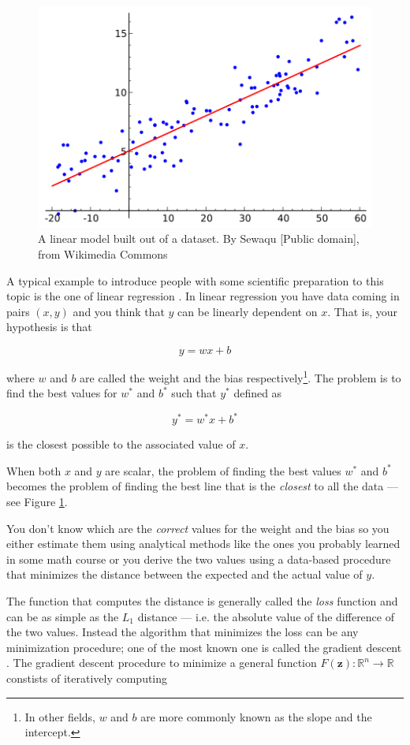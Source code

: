 \begin{figure}
  \centering
  \includegraphics[width=0.5\linewidth]{Images/wikipedia-linear-regression.png}
  \caption{A linear model built out of a dataset. By Sewaqu [Public
      domain], from Wikimedia Commons}
  \label{fig:wikipedia-linear-regression}
\end{figure}

A typical example to introduce people with some scientific preparation
to this topic is the one of linear regression \cite{B071JXYDDB}. In
linear regression you have data coming in pairs $(x, y)$ and you think
that $y$ can be linearly dependent on $x$. That is, your hypothesis is
that

\begin{equation}
  y = w x + b
  \label{eq:linear-model}
\end{equation}

where $w$ and $b$ are called the weight and the bias
respectively\footnote{In other fields, $w$ and $b$ are more commonly
  known as the slope and the intercept.}. The problem is to find the
best values for $w^*$ and $b^*$ such that $y^*$ defined as

\[ y^* = w^* x + b^* \]

is the closest possible to the associated value of $x$.

When both $x$ and $y$ are scalar, the problem of finding the best
values $w^*$ and $b^*$ becomes the problem of finding the best line
that is the \emph{closest} to all the data --- see Figure
\ref{fig:wikipedia-linear-regression}.

You don't know which are the \emph{correct} values for the weight and
the bias so you either estimate them using analytical methods like the ones
you probably learned in some math course or you derive the two values
using a data-based procedure that minimizes the
distance between the expected and the actual value of $y$.

The function that computes the distance is generally called the
\emph{loss} function and can be as simple as the $L_1$ distance
\cite{taxicab-geometry} --- i.e. the absolute value of the difference
of the two values. Instead the algorithm that minimizes the loss can be
any minimization procedure; one of the most known one is called the
gradient descent \cite{Goodfellow-et-al-2016}. The gradient descent
procedure to minimize a general function $F(\boldsymbol{z}):
\mathbb{R}^n \rightarrow \mathbb{R}$ constists of iteratively computing

